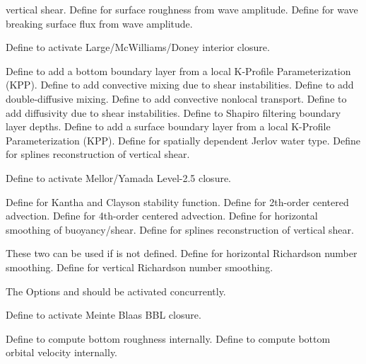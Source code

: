 \begin{klist}
\begin{klist}
\begin{klist}
       vertical shear.
         Define for surface roughness from wave
       amplitude.
         Define for wave breaking surface flux from
       wave amplitude.
    \end{klist}
       Define to activate Large/McWilliams/Doney
   interior closure.
    \begin{klist}
       Define to add a bottom boundary layer from a local
   K-Profile Parameterization (KPP).
       Define to add convective mixing due to shear
   instabilities.
       Define to add double-diffusive mixing.
      Define to add convective nonlocal transport.
       Define to add diffusivity due to shear
   instabilities.
       Define to Shapiro filtering boundary layer
   depths.
       Define to add a surface boundary layer from a local
   K-Profile Parameterization (KPP).
       Define for spatially dependent Jerlov
     water type.
         Define for splines reconstruction of
       vertical shear.
    \end{klist}
       Define to activate Mellor/Yamada Level-2.5
   closure.
    \begin{klist}
         Define for Kantha and Clayson stability
       function.
         Define for 2th-order centered advection.
         Define for 4th-order centered advection.
         Define for horizontal smoothing of
       buoyancy/shear.
         Define for splines reconstruction of
       vertical shear.
    \end{klist}
    These two can be used if  is not defined.
       Define for horizontal Richardson number
   smoothing.
       Define for vertical Richardson number
   smoothing.
  \end{klist}
   \mbox{}
  The Options  and  should be activated concurrently.
    \begin{klist}
       Define to activate Meinte Blaas BBL closure.
      \begin{klist}
         Define to compute bottom roughness
      internally.
         Define to compute bottom orbital velocity
    internally.

\end{klist}
\end{klist}
\end{klist}
